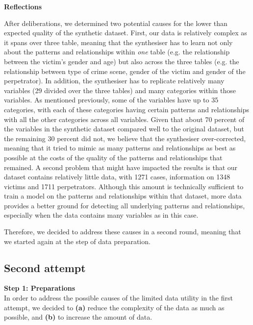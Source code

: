 \textbf{Reflections}

After deliberations, we determined two potential causes for the lower than expected quality of the synthetic dataset. First, our data is relatively complex as it spans over three table, meaning that the synthesiser has to learn not only about the patterns and relationships within \textit{one} table (e.g. the relationship between the victim's gender and age) but also across the three tables (e.g. the relationship between type of crime scene, gender of the victim and gender of the perpetrator). In addition, the synthesiser has to replicate relatively many variables (29 divided over the three tables) and many categories within those variables. As mentioned previously, some of the variables have up to 35 categories, with each of these categories having certain patterns and relationships with all the other categories across all variables. Given that about 70 percent of the variables in the synthetic dataset compared well to the original dataset, but the remaining 30 percent did not, we believe that the synthesiser over-corrected, meaning that it tried to mimic as many patterns and relationships as best as possible at the costs of the quality of the patterns and relationships that remained. A second problem that might have impacted the results is that our dataset contains relatively little data, with 1271 cases, information on 1348 victims and 1711 perpetrators. Although this amount is technically sufficient to train a model on the patterns and relationships within that dataset, more data provides a better ground for detecting all underlying patterns and relationships, especially when the data contains many variables as in this case.

Therefore, we decided to address these causes in a second round, meaning that we started again at the step of data preparation.


\subsection{Second attempt}

\textbf{Step 1: Preparations}\\
In order to address the possible causes of the limited data utility in the first attempt, we decided to \textbf{(a)} reduce the complexity of the data as much as possible, and \textbf{(b)} to increase the amount of data.

